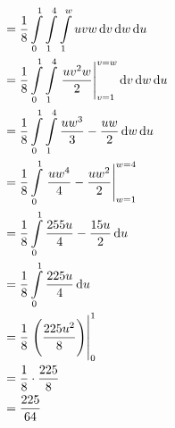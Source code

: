 \documentclass[fleqn, a4paper, 12pt, twoside]{article}
\theoremstyle{definition}
\theoremstyle{theorem}
\begin{document}
\begin{solution}
\begin{align*}
		&= \frac{1}{8} \int\limits_{0}^{1} \int\limits_{1}^{4} \int\limits_{1}^{w} u v w \dif v \dif w \dif u\\
		&= \frac{1}{8} \int\limits_{0}^{1} \int\limits_{1}^{4} \left. \frac{u v^2 w}{2} \right|_{v = 1}^{v = w} \dif v \dif w \dif u\\
		&= \frac{1}{8} \int\limits_{0}^{1} \int\limits_{1}^{4} \frac{u w^3}{3} - \frac{u w}{2} \dif w \dif u\\
		&= \frac{1}{8} \int\limits_{0}^{1} \left. \frac{u w^4}{4} - \frac{u w^2}{2} \right|_{w = 1}^{w = 4}\\
		&= \frac{1}{8} \int\limits_{0}^{1} \frac{255 u}{4} - \frac{15 u}{2} \dif u\\
		&= \frac{1}{8} \int\limits_{0}^{1} \frac{225 u}{4} \dif u\\
		&= \frac{1}{8} \left. \left( \frac{225 u^2}{8} \right) \right|_{0}^{1}\\
		&= \frac{1}{8} \cdot \frac{225}{8}\\
		&= \frac{225}{64}
	\end{align*}
\end{solution}
\end{document}
